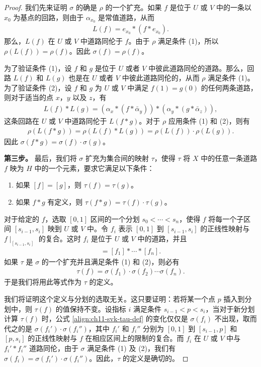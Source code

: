 \documentclass[../../main.tex]{subfiles}
\begin{document}
\begin{proof}
我们先来证明 $\sigma$ 的确是 $\rho$ 的一个扩充。如果 $f$ 是位于 $U$ 或 $V$ 中的一条以 $x_0$ 为基点的回路，则由于 $\alpha_{x_0}$ 是常值道路，从而
\begin{align*}
L(f)=e_{x_0}*(f*e_{x_0}).
\end{align*}
那么，$L(f)$ 在 $U$ 或 $V$ 中道路同伦于 $f$。由于 $\rho$ 满足条件 (1)，所以 $\rho(L(f))=\rho(f)$。因此 $\sigma(f)=\rho(f)$。

为了验证条件 (1)，设 $f$ 和 $g$ 是位于 $U$ 或者 $V$ 中彼此道路同伦的道路。那么，回路 $L(f)$ 和 $L(g)$ 也是在 $U$ 或者 $V$ 中彼此道路同伦的，从而 $\rho$ 满足条件 (1)。为了验证条件 (2)，设 $f$ 和 $g$ 为 $U$ 或 $V$ 中满足 $f(1)=g(0)$ 的任何两条道路，则对于适当的点 $x$，$y$ 以及 $z$，有
\begin{align*}
L(f)*L(g)=(\alpha_x*(f*\bar{\alpha}_y))*(\alpha_y*(g*\bar{\alpha}_z)),
\end{align*}
这条回路在 $U$ 或 $V$ 中道路同伦于 $L(f*g)$。对于 $\rho$ 应用条件 (1) 和 (2)，则有
\begin{align*}
\rho(L(f*g))=\rho(L(f)*L(g))=\rho(L(f))\cdot\rho(L(g)).
\end{align*}
因此 $\sigma(f*g)=\sigma(f)\cdot\sigma(g)$。

\textbf{第三步。} 最后，我们将 $\sigma$ 扩充为集合间的映射 $\tau$，使得 $\tau$ 将 $X$ 中的任意一条道路 $f$ 映为 $H$ 中的一个元素，要求它满足以下条件：
\begin{enumerate}[(1)]
\item 如果 $[f]=[g]$，则 $\tau(f)=\tau(g)$。
\item 如果 $f*g$ 有定义，则 $\tau(f*g)=\tau(f)\cdot\tau(g)$。
\end{enumerate}

对于给定的 $f$，选取 $[0,1]$ 区间的一个分划 $s_0<\cdots<s_n$，使得 $f$ 将每一个子区间 $[s_{i-1},s_i]$ 映到 $U$ 或 $V$ 中。令 $f_i$ 表示 $[0,1]$ 到 $[s_{i-1},s_i]$ 的正线性映射与 $f\mid_{[s_{i-1},s_i]}$ 的复合。这时 $f_i$ 是位于 $U$ 或 $V$ 中的道路，并且
\begin{align*}
[f]=[f_1]*\cdots*[f_n].
\end{align*}
如果 $\tau$ 是 $\sigma$ 的一个扩充并且满足条件 (1) 和 (2)，则必有
\begin{align}
\tau(f)=\sigma(f_1)\cdot\sigma(f_2)\cdots\sigma(f_n).\label{align:ch11-svk-tau-def}
\end{align}
于是我们将用此等式作为 $\tau$ 的定义。

我们将证明这个定义与分划的选取无关。这只要证明：若将某一个点 $p$ 插入到分划中，则 $\tau(f)$ 的值保持不变。设指标 $i$ 满足条件 $s_{i-1}<p<s_i$，当对于新分划计算 $\tau(f)$ 时，公式 \eqref{align:ch11-svk-tau-def} 的变化仅仅是 $\sigma(f_i)$ 不出现，取而代之的是 $\sigma(f_i')\cdot\sigma(f_i'')$，其中 $f_i'$ 和 $f_i''$ 分别为 $[0,1]$ 到 $[s_{i-1},p]$ 和 $[p,s_i]$ 的正线性映射与 $f$ 在相应区间上的限制的复合。而 $f_i$ 在 $U$ 或 $V$ 中与 $f_i'*f_i''$ 道路同伦，由于 $\sigma$ 满足条件 (1) 及 (2)，我们有 $\sigma(f_i)=\sigma(f_i')\cdot\sigma(f_i'')$。因此，$\tau$ 的定义是确切的。


\end{proof}
\end{document}
